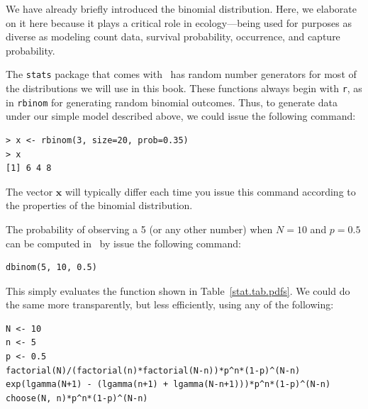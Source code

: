 We have already briefly introduced the binomial distribution. Here, we
elaborate on it here because it plays a critical role in ecology---being
used for purposes as diverse as modeling count data, survival
probability, occurrence, and capture probability.

The \texttt{stats} package that comes with \R~has random number
generators for most of the distributions we will use in this
book. These functions always begin with \texttt{r}, as in
\texttt{rbinom} for generating random binomial outcomes. Thus, to
generate data under our simple model described above, we
could issue the following command:
\begin{verbatim}
> x <- rbinom(3, size=20, prob=0.35)
> x
[1] 6 4 8
\end{verbatim}
The vector $\mathbf{x}$ will typically differ each time you issue this
command according to the properties of the binomial distribution.

The probability of
observing a 5 (or any other number) when $N=10$ and $p=0.5$ can be
computed in \R~by issue the following command:
\begin{verbatim}
dbinom(5, 10, 0.5)
\end{verbatim}
This simply evaluates the function shown in
Table~\ref{stat.tab.pdfs}. We could do the same more transparently, but
less efficiently, using any of the following:
\begin{verbatim}
N <- 10
n <- 5
p <- 0.5
factorial(N)/(factorial(n)*factorial(N-n))*p^n*(1-p)^(N-n)
exp(lgamma(N+1) - (lgamma(n+1) + lgamma(N-n+1)))*p^n*(1-p)^(N-n)
choose(N, n)*p^n*(1-p)^(N-n)
\end{verbatim}

